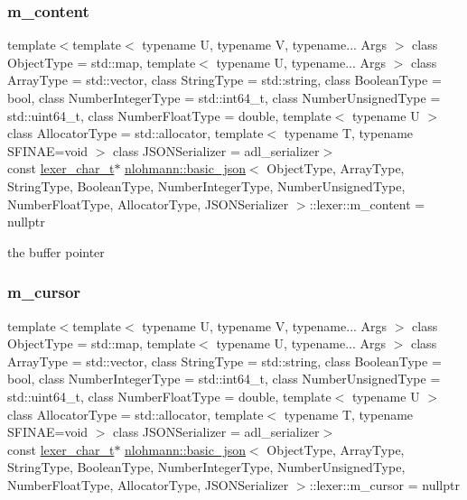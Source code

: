 \subsubsection{\texorpdfstring{m\+\_\+content}{m\_content}}
{\footnotesize\ttfamily template$<$template$<$ typename U, typename V, typename... Args $>$ class Object\+Type = std\+::map, template$<$ typename U, typename... Args $>$ class Array\+Type = std\+::vector, class String\+Type  = std\+::string, class Boolean\+Type  = bool, class Number\+Integer\+Type  = std\+::int64\+\_\+t, class Number\+Unsigned\+Type  = std\+::uint64\+\_\+t, class Number\+Float\+Type  = double, template$<$ typename U $>$ class Allocator\+Type = std\+::allocator, template$<$ typename T, typename S\+F\+I\+N\+A\+E=void $>$ class J\+S\+O\+N\+Serializer = adl\+\_\+serializer$>$ \\
const \hyperlink{classnlohmann_1_1basic__json_1_1lexer_abe04be04d0575249f8806c334bacbc80}{lexer\+\_\+char\+\_\+t}$\ast$ \hyperlink{classnlohmann_1_1basic__json}{nlohmann\+::basic\+\_\+json}$<$ Object\+Type, Array\+Type, String\+Type, Boolean\+Type, Number\+Integer\+Type, Number\+Unsigned\+Type, Number\+Float\+Type, Allocator\+Type, J\+S\+O\+N\+Serializer $>$\+::lexer\+::m\+\_\+content = nullptr\hspace{0.3cm}{\ttfamily [private]}}



the buffer pointer 

\mbox{\label{classnlohmann_1_1basic__json_1_1lexer_a13872f4378b6a140e1125160bfa8e92e}} 
\subsubsection{\texorpdfstring{m\+\_\+cursor}{m\_cursor}}
{\footnotesize\ttfamily template$<$template$<$ typename U, typename V, typename... Args $>$ class Object\+Type = std\+::map, template$<$ typename U, typename... Args $>$ class Array\+Type = std\+::vector, class String\+Type  = std\+::string, class Boolean\+Type  = bool, class Number\+Integer\+Type  = std\+::int64\+\_\+t, class Number\+Unsigned\+Type  = std\+::uint64\+\_\+t, class Number\+Float\+Type  = double, template$<$ typename U $>$ class Allocator\+Type = std\+::allocator, template$<$ typename T, typename S\+F\+I\+N\+A\+E=void $>$ class J\+S\+O\+N\+Serializer = adl\+\_\+serializer$>$ \\
const \hyperlink{classnlohmann_1_1basic__json_1_1lexer_abe04be04d0575249f8806c334bacbc80}{lexer\+\_\+char\+\_\+t}$\ast$ \hyperlink{classnlohmann_1_1basic__json}{nlohmann\+::basic\+\_\+json}$<$ Object\+Type, Array\+Type, String\+Type, Boolean\+Type, Number\+Integer\+Type, Number\+Unsigned\+Type, Number\+Float\+Type, Allocator\+Type, J\+S\+O\+N\+Serializer $>$\+::lexer\+::m\+\_\+cursor = nullptr\hspace{0.3cm}{\ttfamily [private]}}



